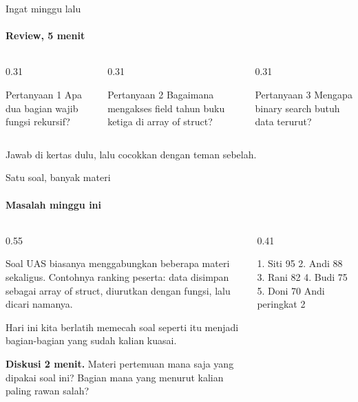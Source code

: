 \documentclass[t]{beamer}
\begin{document}
\begin{frame}{Ingat minggu lalu}
\framesubtitle{Review, 5 menit}
\begin{columns}[T]
\begin{column}{0.31\textwidth}
\begin{BlokGelap}{Pertanyaan 1}
Apa dua bagian wajib fungsi rekursif?
\end{BlokGelap}
\end{column}
\begin{column}{0.31\textwidth}
\begin{BlokGelap}{Pertanyaan 2}
Bagaimana mengakses field tahun buku ketiga di array of struct?
\end{BlokGelap}
\end{column}
\begin{column}{0.31\textwidth}
\begin{BlokGelap}{Pertanyaan 3}
Mengapa binary search butuh data terurut?
\end{BlokGelap}
\end{column}
\end{columns}
\vspace{8pt}
Jawab di kertas dulu, lalu cocokkan dengan teman sebelah.
\end{frame}


\begin{frame}[fragile]{Satu soal, banyak materi}
\framesubtitle{Masalah minggu ini}
\begin{columns}[T]
\begin{column}{0.55\textwidth}
{Soal UAS biasanya menggabungkan beberapa materi sekaligus. Contohnya ranking peserta: data disimpan sebagai array of struct, diurutkan dengan fungsi, lalu dicari namanya.

\vspace{6pt}
Hari ini kita berlatih memecah soal seperti itu menjadi bagian-bagian yang sudah kalian kuasai.\par}
\vspace{6pt}
\begin{Catatan}
\textbf{Diskusi 2 menit.} Materi pertemuan mana saja yang dipakai soal ini? Bagian mana yang menurut kalian paling rawan salah?
\end{Catatan}
\end{column}
\begin{column}{0.41\textwidth}
\begin{Keluaran}[]
1. Siti 95
2. Andi 88
3. Rani 82
4. Budi 75
5. Doni 70
Andi peringkat 2
\end{Keluaran}
\end{column}
\end{columns}
\end{frame}
\end{document}
